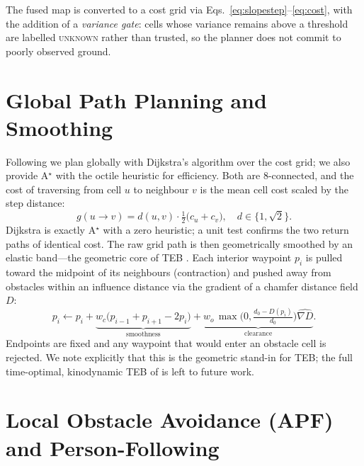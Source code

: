 \documentclass[11pt]{article}
\begin{document}
The fused map is converted to a cost grid via
Eqs.~\eqref{eq:slopestep}--\eqref{eq:cost}, with the addition of a
\emph{variance gate}: cells whose variance remains above a threshold are labelled
\textsc{unknown} rather than trusted, so the planner does not commit to poorly
observed ground.

\section{Global Path Planning and Smoothing}
\label{sec:global}

Following \cite{refpaper} we plan globally with Dijkstra's algorithm
\cite{dijkstra1959} over the cost grid; we also provide A$^\star$ \cite{hart1968}
with the octile heuristic for efficiency. Both are 8-connected, and the cost of
traversing from cell $u$ to neighbour $v$ is the mean cell cost scaled by the step
distance:
\begin{equation}
g(u\!\to\!v) = d(u,v)\cdot\tfrac{1}{2}\big(c_u + c_v\big),\quad
d\in\{1,\sqrt2\}.
\label{eq:edge}
\end{equation}
Dijkstra is exactly A$^\star$ with a zero heuristic; a unit test confirms the two
return paths of identical cost. The raw grid path is then geometrically smoothed
by an elastic band---the geometric core of TEB \cite{rosmann2017}. Each interior
waypoint $p_i$ is pulled toward the midpoint of its neighbours (contraction) and
pushed away from obstacles within an influence distance via the gradient of a
chamfer distance field $D$:
\begin{equation}
p_i \leftarrow p_i + \underbrace{w_c\big(p_{i-1}+p_{i+1}-2p_i\big)}_{\text{smoothness}}
 + \underbrace{w_o\,\max\!\Big(0,\tfrac{d_0-D(p_i)}{d_0}\Big)\widehat{\nabla D}}_{\text{clearance}}.
\label{eq:eband}
\end{equation}
Endpoints are fixed and any waypoint that would enter an obstacle cell is rejected.
We note explicitly that this is the geometric stand-in for TEB; the full
time-optimal, kinodynamic TEB of \cite{rosmann2017} is left to future work.

\section{Local Obstacle Avoidance (APF) and Person-Following}
\label{sec:apf}
\end{document}
